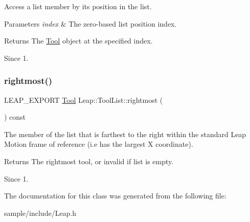 Access a list member by its position in the list.


\begin{DoxyCodeInclude}
\end{DoxyCodeInclude}



\begin{DoxyParams}{Parameters}
{\em index} & The zero-\/based list position index. \\
\hline
\end{DoxyParams}
\begin{DoxyReturn}{Returns}
The \hyperlink{class_leap_1_1_tool}{Tool} object at the specified index. 
\end{DoxyReturn}
\begin{DoxySince}{Since}
1. 
\end{DoxySince}
\mbox{\label{class_leap_1_1_tool_list_a7f1a5e3b06985e0760c24b50d8451ae5}} 
\subsubsection{\texorpdfstring{rightmost()}{rightmost()}}
{\footnotesize\ttfamily L\+E\+A\+P\+\_\+\+E\+X\+P\+O\+RT \hyperlink{class_leap_1_1_tool}{Tool} Leap\+::\+Tool\+List\+::rightmost (\begin{DoxyParamCaption}{ }\end{DoxyParamCaption}) const}

The member of the list that is farthest to the right within the standard Leap Motion frame of reference (i.\+e has the largest X coordinate).


\begin{DoxyCodeInclude}
\end{DoxyCodeInclude}


\begin{DoxyReturn}{Returns}
The rightmost tool, or invalid if list is empty. 
\end{DoxyReturn}
\begin{DoxySince}{Since}
1. 
\end{DoxySince}


The documentation for this class was generated from the following file\+:\begin{DoxyCompactItemize}
\item 
sample/include/Leap.\+h\end{DoxyCompactItemize}
